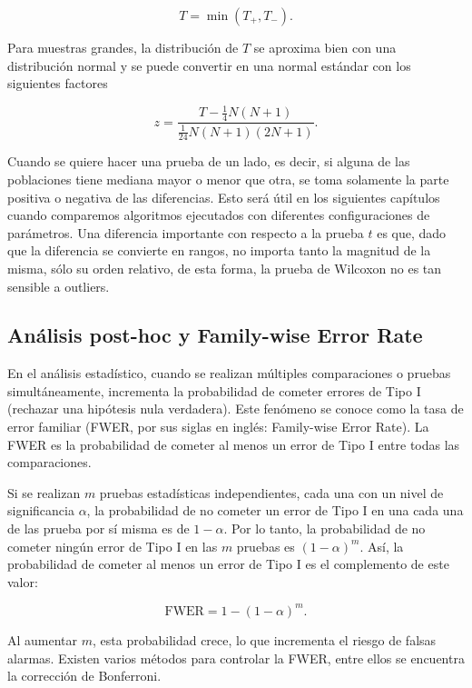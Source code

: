 $$
T = \min(T_+, T_-).
$$


Para muestras grandes, la distribución de \(T\) se aproxima bien con una distribución normal y se puede convertir en una normal estándar con los siguientes factores

$$z= \frac{T-\frac{1}{4}N(N+1)}{\frac{1}{24}N(N+1)(2N+1)}.$$

Cuando se quiere hacer una prueba de un lado, es decir, si alguna de las poblaciones tiene mediana mayor o menor que otra, se toma solamente la parte positiva o negativa de las diferencias. Esto será útil en los siguientes capítulos cuando comparemos algoritmos ejecutados con diferentes configuraciones de parámetros. Una diferencia importante con respecto a la prueba $t$ es que, dado que la diferencia se convierte en rangos, no importa tanto la magnitud de la misma, sólo su orden relativo, de esta forma, la prueba de Wilcoxon no es tan sensible a outliers. 


\subsection{Análisis post-hoc y Family-wise Error Rate} \label{sec:FWER_Bonferroni}



En el análisis estadístico, cuando se realizan múltiples comparaciones o pruebas simultáneamente, incrementa la probabilidad de cometer errores de Tipo I (rechazar una hipótesis nula verdadera). Este fenómeno se conoce como la tasa de error familiar (FWER, por sus siglas en inglés: Family-wise Error Rate). La FWER es la probabilidad de cometer al menos un error de Tipo I entre todas las comparaciones.

Si se realizan $m$ pruebas estadísticas independientes, cada una con un nivel de significancia $\alpha$, la probabilidad de no cometer un error de Tipo I en una cada una de las prueba por sí misma es de $1 - \alpha$. Por lo tanto, la probabilidad de no cometer ningún error de Tipo I en las $m$ pruebas es $(1 - \alpha)^m$. Así, la probabilidad de cometer al menos un error de Tipo I es el complemento de este valor:

\begin{equation} \label{eq:FWER}
\text{FWER} = 1 - (1 - \alpha)^m.
\end{equation}

Al aumentar $m$, esta probabilidad crece, lo que incrementa el riesgo de falsas alarmas. Existen varios métodos para controlar la FWER, entre ellos se encuentra la corrección de Bonferroni.

